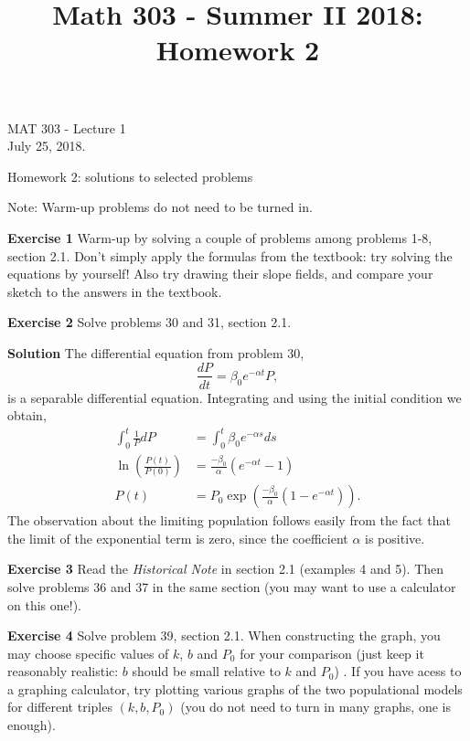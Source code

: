 \documentclass[12pt,oneside]{exam}
\title{Math 303 - Summer II 2018: Homework 2}
\newenvironment{exercise}[1]{\vspace{.1in}\noindent\textbf{Exercise #1 \hspace{.05em}}}{}
\newenvironment{newsolution}{\vspace{.1in}\noindent\textbf{Solution \hspace{.05em}}}{}
\begin{document}
\begin{flushright}
\sc MAT 303 - Lecture 1\\
July 25, 2018.
\end{flushright}
\bigskip


\begin{center}
\textsf{Homework 2: solutions to selected problems} 
\end{center}


Note: Warm-up problems do not need to be turned in. 

\begin{exercise}{1}
Warm-up by solving a couple of problems among problems 1-8, section 2.1. Don't simply apply the formulas from the textbook: try solving the equations by yourself! Also try drawing their slope fields, and compare your sketch to the answers in the textbook.
\end{exercise}

\begin{exercise}{2}
Solve problems 30 and 31, section 2.1. 
\end{exercise}

\begin{newsolution}
The differential equation from problem 30, 
\begin{equation*}
\frac{dP}{dt} = \beta_0 e^{-\alpha t}P,
\end{equation*}
is a separable differential equation.  Integrating and using the initial condition we obtain,   
\begin{align*}
\int_{0}^{t} \frac{1}{P} dP & = \int_{0}^{t} \beta_0 e^{-\alpha s} ds \\
\ln\left(\frac{P(t)}{P(0)}\right)& = \frac{-\beta_0}{\alpha}(e^{-\alpha t}-1)\\
P(t) & =P_0 \exp\left( \frac{-\beta_0}{\alpha}(1-e^{-\alpha t})\right).
\end{align*}
The observation about the limiting population follows easily from the fact that the limit of the exponential term is zero, since the coefficient $\alpha$ is positive. 
\end{newsolution}

\begin{exercise}{3}
Read the \textit{Historical Note} in section 2.1 (examples 4 and 5). Then solve problems 36 and 37 in the same section (you may want to use a calculator on this one!). 
\end{exercise}

\begin{exercise}{4} 
Solve problem 39, section 2.1. When constructing the graph, you may choose specific values of $k$, $b$ and $P_0$ for your comparison (just keep it reasonably realistic: $b$ should be small relative to $k$ and $P_0$) . If you have acess to a graphing calculator, try plotting various graphs of the two populational models for different triples $(k,b,P_0)$ (you do not need to turn in many graphs, one is enough). 
\end{exercise}
\end{document}
